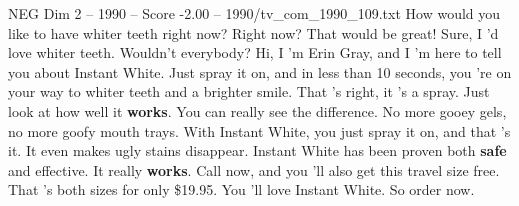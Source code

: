 \begin{textsample}{NEG Dim 2 – 1990 – Score -2.00 – 1990/tv\_com\_1990\_109.txt}  \label{ex:f2_neg_061}
How would you like to have whiter teeth right now?
Right now?
That would be great!
Sure, I 'd love whiter teeth.
Wouldn't everybody?
Hi, I 'm Erin Gray, and I 'm here to tell you about Instant White.
Just spray it on, and in less than 10 seconds, you 're on your way to whiter teeth and a brighter smile.
That 's right, it 's a spray.
Just look at how well it \textbf{works}.
You can really see the difference.
No more gooey gels, no more goofy mouth trays.
With Instant White, you just spray it on, and that 's it.
It even makes ugly stains disappear.
Instant White has been proven both \textbf{safe} and effective.
It really \textbf{works}.
Call now, and you 'll also get this travel size free.
That 's both sizes for only \$19.95.
You 'll love Instant White.
So order now.

\end{textsample}
